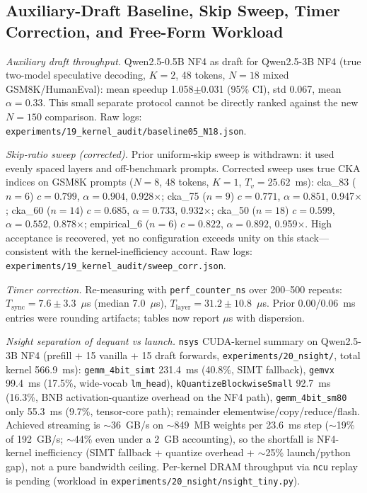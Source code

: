 \documentclass[10pt,twocolumn,letterpaper]{article}
\begin{document}
\subsection{Auxiliary-Draft Baseline, Skip Sweep, Timer Correction, and Free-Form Workload}
\label{sec:aux}

\textit{Auxiliary draft throughput.} Qwen2.5-0.5B NF4 as draft for Qwen2.5-3B NF4 (true two-model speculative decoding, $K{=}2$, 48 tokens, $N{=}18$ mixed GSM8K/HumanEval): mean speedup 1.058$\pm$0.031 (95\% CI), std 0.067, mean $\alpha{=}0.33$. This small separate protocol cannot be directly ranked against the new $N{=}150$ comparison. Raw logs: \texttt{experiments/19\_kernel\_audit/baseline05\_N18.json}.

\textit{Skip-ratio sweep (corrected).}
\label{sec:sweep_corr}
Prior uniform-skip sweep is withdrawn: it used evenly spaced layers and off-benchmark prompts. Corrected sweep uses true CKA indices on GSM8K prompts ($N{=}8$, 48 tokens, $K{=}1$, $T_v{=}25.62$~ms): cka\_83 ($n{=}6$) $c{=}0.799$, $\alpha{=}0.904$, 0.928$\times$; cka\_75 ($n{=}9$) $c{=}0.771$, $\alpha{=}0.851$, 0.947$\times$; cka\_60 ($n{=}14$) $c{=}0.685$, $\alpha{=}0.733$, 0.932$\times$; cka\_50 ($n{=}18$) $c{=}0.599$, $\alpha{=}0.552$, 0.878$\times$; empirical\_6 ($n{=}6$) $c{=}0.822$, $\alpha{=}0.892$, 0.959$\times$. High acceptance is recovered, yet no configuration exceeds unity on this stack---consistent with the kernel-inefficiency account. Raw logs: \texttt{experiments/19\_kernel\_audit/sweep\_corr.json}.

\textit{Timer correction.} Re-measuring with \texttt{perf\_counter\_ns} over 200--500 repeats: $T_{\mathrm{sync}}{=}7.6{\pm}3.3$~$\mu$s (median 7.0~$\mu$s), $T_{\mathrm{layer}}{=}31.2{\pm}10.8$~$\mu$s. Prior 0.00/0.06~ms entries were rounding artifacts; tables now report $\mu$s with dispersion.

\textit{Nsight separation of dequant vs launch.} \texttt{nsys} CUDA-kernel summary on Qwen2.5-3B NF4 (prefill + 15 vanilla + 15 draft forwards, \texttt{experiments/20\_nsight/}, total kernel 566.9~ms): \texttt{gemm\_4bit\_simt} 231.4~ms (40.8\%, SIMT fallback), \texttt{gemvx} 99.4~ms (17.5\%, wide-vocab \texttt{lm\_head}), \texttt{kQuantizeBlockwiseSmall} 92.7~ms (16.3\%, BNB activation-quantize overhead on the NF4 path), \texttt{gemm\_4bit\_sm80} only 55.3~ms (9.7\%, tensor-core path); remainder elementwise/copy/reduce/flash. Achieved streaming is $\sim$36~GB/s on $\sim$849~MB weights per 23.6~ms step ($\sim$19\% of 192~GB/s; $\sim$44\% even under a 2~GB accounting), so the shortfall is NF4-kernel inefficiency (SIMT fallback + quantize overhead + $\sim$25\% launch/python gap), not a pure bandwidth ceiling. Per-kernel DRAM throughput via \texttt{ncu} replay is pending (workload in \texttt{experiments/20\_nsight/nsight\_tiny.py}).
\end{document}
